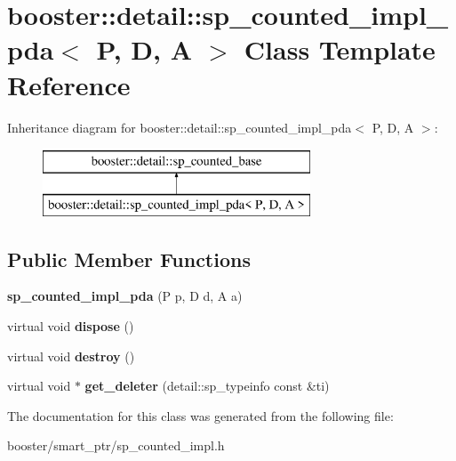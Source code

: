 \section{booster\+:\+:detail\+:\+:sp\+\_\+counted\+\_\+impl\+\_\+pda$<$ P, D, A $>$ Class Template Reference}
\label{classbooster_1_1detail_1_1sp__counted__impl__pda}
Inheritance diagram for booster\+:\+:detail\+:\+:sp\+\_\+counted\+\_\+impl\+\_\+pda$<$ P, D, A $>$\+:\begin{figure}[H]
\begin{center}
\leavevmode
\includegraphics[height=2.000000cm]{classbooster_1_1detail_1_1sp__counted__impl__pda}
\end{center}
\end{figure}
\subsection*{Public Member Functions}
\begin{DoxyCompactItemize}
\item 
{\bfseries sp\+\_\+counted\+\_\+impl\+\_\+pda} (P p, D d, A a)\label{classbooster_1_1detail_1_1sp__counted__impl__pda_a7c9dab83a3f29f6611fc274ff33b36e6}

\item 
virtual void {\bfseries dispose} ()\label{classbooster_1_1detail_1_1sp__counted__impl__pda_add9a4d9f11df14d9401b856f8ac89521}

\item 
virtual void {\bfseries destroy} ()\label{classbooster_1_1detail_1_1sp__counted__impl__pda_a756d031c3ba4c91cf5e7372c0323ab29}

\item 
virtual void $\ast$ {\bfseries get\+\_\+deleter} (detail\+::sp\+\_\+typeinfo const \&ti)\label{classbooster_1_1detail_1_1sp__counted__impl__pda_a01deec0dd9b1b2fee06e41eb110d8f73}

\end{DoxyCompactItemize}


The documentation for this class was generated from the following file\+:\begin{DoxyCompactItemize}
\item 
booster/smart\+\_\+ptr/sp\+\_\+counted\+\_\+impl.\+h\end{DoxyCompactItemize}
